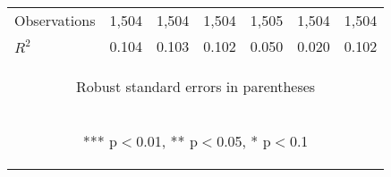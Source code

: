 \begin{center}
\begin{tabular}{lcccccc}
Observations & 1,504 & 1,504 & 1,504 & 1,505 & 1,504 & 1,504 \\
 $R^2$ & 0.104 & 0.103 & 0.102 & 0.050 & 0.020 & 0.102 \\ \hline
\multicolumn{7}{c}{\begin{footnotesize} Robust standard errors in parentheses\end{footnotesize}} \\
\multicolumn{7}{c}{\begin{footnotesize} *** p$<$0.01, ** p$<$0.05, * p$<$0.1\end{footnotesize}} \\
\end{tabular}
\end{center}
